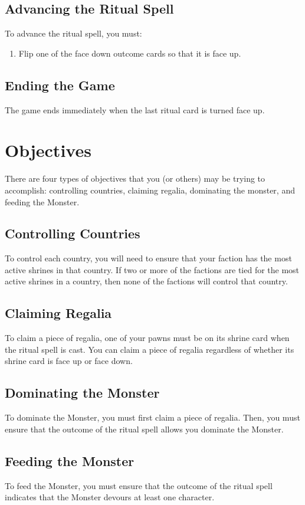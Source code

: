 \documentclass[10pt, parskip=half-, twoside]{scrartcl}
\begin{document}
\subsection*{Advancing the Ritual Spell}
To advance the ritual spell, you must:
\begin{enumerate}
	\item Flip one of the face down outcome cards so that it is face up.
\end{enumerate}
	
\subsection*{Ending the Game}
The game ends immediately when the last ritual card is turned face up.

\newpage

\section*{Objectives}
There are four types of objectives that you (or others) may be trying to accomplish: controlling countries, claiming regalia, dominating the monster, and feeding the Monster.

\subsection*{Controlling Countries}
To control each country, you will need to ensure that your faction has the most active shrines in that country. If two or more of the factions are tied for the most active shrines in a country, then none of the factions will control that country.

\subsection*{Claiming Regalia}
To claim a piece of regalia, one of your pawns must be on its shrine card when the ritual spell is cast. You can claim a piece of regalia regardless of whether its shrine card is face up or face down.

\subsection*{Dominating the Monster}
To dominate the Monster, you must first claim a piece of regalia. Then, you must ensure that the outcome of the ritual spell allows you dominate the Monster.

\subsection*{Feeding the Monster}
To feed the Monster, you must ensure that the outcome of the ritual spell indicates that the Monster devours at least one character.
\end{document}

